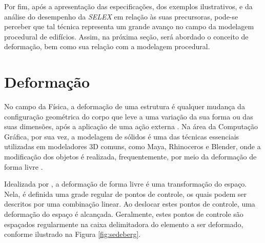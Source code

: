 Por fim, após a apresentação das especificações, dos exemplos ilustrativos, e da análise do desempenho da \textit{SELEX} em relação às suas precursoras, pode-se perceber que tal técnica representa um grande avanço no campo da modelagem procedural de edifícios. Assim, na próxima seção, será abordado o conceito de deformação, bem como sua relação com a modelagem procedural.

\newpage

\section{Deformação}
\label{sec:deformacao}

No campo da Física, a deformação de uma estrutura é qualquer mudança da configuração geométrica do corpo que leve a uma variação da sua forma ou das suas dimensões, após a aplicação de uma ação externa \cite{truesdell1992}. Na área da Computação Gráfica, por sua vez, a modelagem de sólidos é uma das técnicas essenciais utilizadas em modeladores 3D comuns, como Maya, Rhinoceros e Blender, onde a modificação dos objetos é realizada, frequentemente, por meio da deformação de forma livre \cite{jana2017}.

Idealizada por , a deformação de forma livre é uma transformação do espaço. Nela, é definida uma grade regular de pontos de controle, os quais podem ser descritos por uma combinação linear. Ao deslocar estes pontos de controle, uma deformação do espaço é alcançada. Geralmente, estes pontos de controle são espaçados regularmente na caixa delimitadora do elemento a ser deformado, conforme ilustrado na Figura \ref{fig:sedeberg}.

\begin{figure}[h!]
	\centering
	\captionsetup{width=15cm}
	{}	
\end{figure}

